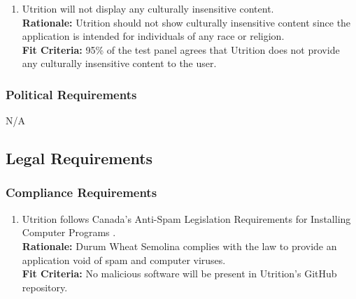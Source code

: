 \documentclass[12pt]{article}
\begin{document}
\begin{enumerate}[{CP}1. ] 
	\item Utrition will not display any culturally insensitive content. \\
	\textbf{Rationale:} Utrition should not show culturally insensitive content since the application is intended for individuals of any race or religion.\\	
	\textbf{Fit Criteria:} 95\% of the test panel agrees that Utrition does not provide any culturally insensitive content to the user.
\end{enumerate}

\subsubsection{Political Requirements}
\hspace{1.5cm}N/A

\subsection{Legal Requirements}
\subsubsection{Compliance Requirements}
\begin{enumerate}[{LR}1. ]
	\item Utrition follows Canada’s Anti-Spam Legislation Requirements for Installing Computer Programs \citep{CanadianInstall}.\\
	\textbf{Rationale:} Durum Wheat Semolina complies with the law to provide an application void of spam and computer viruses.\\
	\textbf{Fit Criteria:} No malicious software will be present in Utrition’s GitHub repository.
\end{enumerate}
\end{document}
